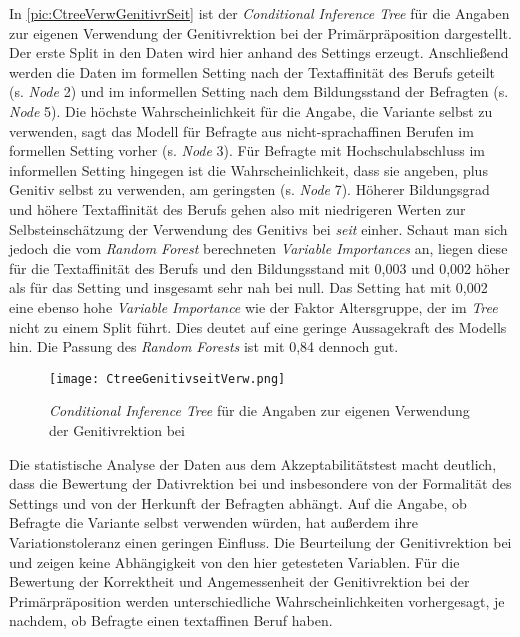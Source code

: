 In \autoref{pic:CtreeVerwGenitivrSeit} ist der \textit{Conditional Inference Tree} für die Angaben zur eigenen Verwendung der Genitivrektion bei der Primärpräposition  dargestellt. 
Der erste Split in den Daten wird hier anhand des Settings erzeugt. 
Anschließend werden die Daten im formellen Setting nach der Textaffinität des Berufs geteilt (s. \textit{Node} 2) und im informellen Setting nach dem Bildungsstand der Befragten (s. \textit{Node} 5). 
Die höchste Wahrscheinlichkeit für die Angabe, die Variante selbst zu verwenden, sagt das Modell für Befragte aus nicht-sprachaffinen Berufen im formellen Setting vorher (s. \textit{Node} 3). 
Für Befragte mit Hochschulabschluss im informellen Setting hingegen ist die Wahrscheinlichkeit, dass sie angeben,  plus Genitiv selbst zu verwenden, am geringsten (s. \textit{Node} 7). 
Höherer Bildungsgrad und höhere Textaffinität des Berufs gehen also mit niedrigeren Werten zur Selbsteinschätzung der Verwendung des Genitivs bei \textit{seit} einher. 
Schaut man sich jedoch die vom \textit{Random Forest} berechneten \textit{Variable Importances} an, liegen diese für die Textaffinität des Berufs und den Bildungsstand mit 0,003 und 0,002 höher als für das Setting und insgesamt sehr nah bei null.
Das Setting hat mit 0,002 eine ebenso hohe \textit{Variable Importance} wie der Faktor \glqq Altersgruppe\grqq, der im \textit{Tree} nicht zu einem Split führt. 
Dies deutet auf eine geringe Aussagekraft des Modells hin. 
Die Passung des \textit{Random Forests} ist mit 0,84 dennoch gut. 
\begin{figure}[p]
\centering
\texttt{[image: CtreeGenitivseitVerw.png]}
\caption{\textit{Conditional Inference Tree} für die Angaben zur eigenen Verwendung der Genitivrektion bei }
\label{pic:CtreeVerwGenitivrSeit}
\end{figure}
 Die statistische Analyse der Daten aus dem Akzeptabilitätstest macht deutlich, dass die Bewertung der Dativrektion bei \wegen{} und \waehrend{} insbesondere von der Formalität des Settings und von der Herkunft der Befragten abhängt.
Auf die Angabe, ob Befragte die Variante selbst verwenden würden, hat außerdem ihre Variationstoleranz einen geringen Einfluss. 
Die Beurteilung der Genitivrektion bei \dank{} und \gegenueber{} zeigen keine Abhängigkeit von den hier getesteten Variablen.
Für die Bewertung der Korrektheit und Angemessenheit der Genitivrektion bei der Primärpräposition  werden unterschiedliche Wahrscheinlichkeiten vorhergesagt, je nachdem, ob Befragte einen textaffinen Beruf haben.  

